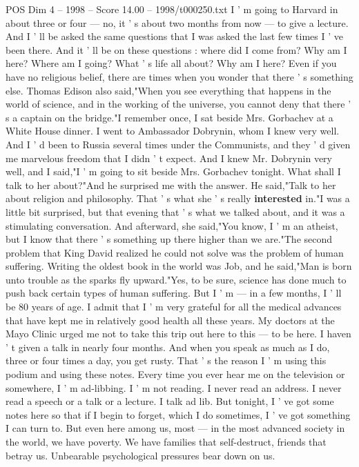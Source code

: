 \begin{textsample}{POS Dim 4 – 1998 – Score 14.00 – 1998/t000250.txt}
I ' m going to Harvard in about three or four — no, it ' s about two months from now — to give a lecture.
And I ' ll be asked the same questions that I was asked the last few times I ' ve been there.
And it ' ll be on these questions : where did I come from?
Why am I here?
Where am I going?
What ' s life all about?
Why am I here?
Even if you have no religious belief, there are times when you wonder that there ' s something else.
Thomas Edison also said,"When you see everything that happens in the world of science, and in the working of the universe, you cannot deny that there ' s a captain on the bridge."I remember once, I sat beside Mrs.
Gorbachev at a White House dinner.
I went to Ambassador Dobrynin, whom I knew very well.
And I ' d been to Russia several times under the Communists, and they ' d given me marvelous freedom that I didn ' t expect.
And I knew Mr.
Dobrynin very well, and I said,"I ' m going to sit beside Mrs.
Gorbachev tonight.
What shall I talk to her about?"And he surprised me with the answer.
He said,"Talk to her about religion and philosophy.
That ' s what she ' s really \textbf{interested} in."I was a little bit surprised, but that evening that ' s what we talked about, and it was a stimulating conversation.
And afterward, she said,"You know, I ' m an atheist, but I know that there ' s something up there higher than we are."The second problem that King David realized he could not solve was the problem of human suffering.
Writing the oldest book in the world was Job, and he said,"Man is born unto trouble as the sparks fly upward."Yes, to be sure, science has done much to push back certain types of human suffering.
But I ' m — in a few months, I ' ll be 80 years of age.
I admit that I ' m very grateful for all the medical advances that have kept me in relatively good health all these years.
My doctors at the Mayo Clinic urged me not to take this trip out here to this — to be here.
I haven ' t given a talk in nearly four months.
And when you speak as much as I do, three or four times a day, you get rusty.
That ' s the reason I ' m using this podium and using these notes.
Every time you ever hear me on the television or somewhere, I ' m ad-libbing.
I ' m not reading.
I never read an address.
I never read a speech or a talk or a lecture.
I talk ad lib.
But tonight, I ' ve got some notes here so that if I begin to forget, which I do sometimes, I ' ve got something I can turn to.
But even here among us, most — in the most advanced society in the world, we have poverty.
We have families that self-destruct, friends that betray us.
Unbearable psychological pressures bear down on us.

\end{textsample}
